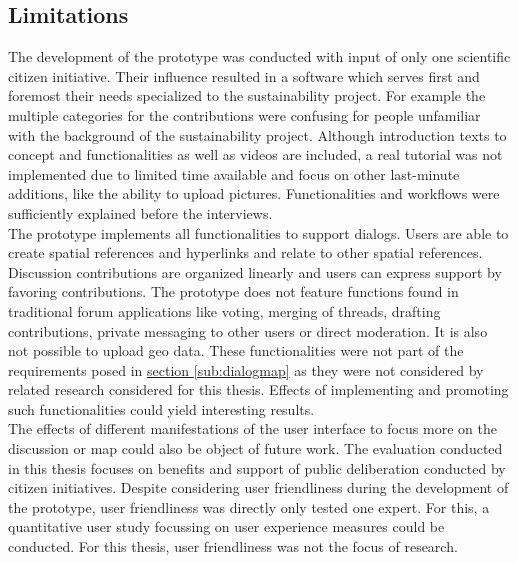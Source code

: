 \subsection{Limitations}
\label{sub:limitations}
The development of the prototype was conducted with input of only one scientific citizen initiative. Their influence resulted in a software which serves first and foremost their needs specialized to the sustainability project. For example the multiple categories for the contributions were confusing for people unfamiliar with the background of the sustainability project. Although introduction texts to concept and functionalities as well as videos are included, a real tutorial was not implemented due to limited time available and focus on other last-minute additions, like the ability to upload pictures. Functionalities and workflows were sufficiently explained before the interviews.\\
The prototype implements all functionalities to support dialogs. Users are able to create spatial references and hyperlinks and relate to other spatial references. Discussion contributions are organized linearly and users can express support by favoring contributions. The prototype does not feature functions found in traditional forum applications like voting, merging of threads, drafting contributions, private messaging to other users or direct moderation. It is also not possible to upload geo data. These functionalities were not part of the requirements posed in \hyperref[sub:dialogmap]{section \ref{sub:dialogmap}} as they were not considered by related research considered for this thesis. Effects of implementing and promoting such functionalities could yield interesting results.\\%
The effects of different manifestations of the user interface to focus more on the discussion or map could also be object of future work.
The evaluation conducted in this thesis focuses on benefits and support of public deliberation conducted by citizen initiatives. Despite considering user friendliness during the development of the prototype, user friendliness was directly only tested one expert. For this, a quantitative user study focussing on user experience measures could be conducted. For this thesis, user friendliness was not the focus of research.\\

